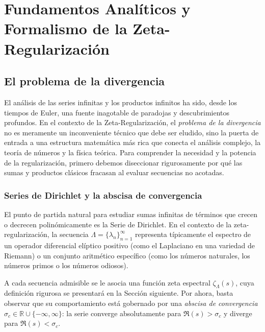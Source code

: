 \chapter{Fundamentos Analíticos y Formalismo de la Zeta-Regularización}

\section{El problema de la divergencia}

El análisis de las series infinitas y los productos infinitos ha sido, desde los tiempos de Euler, una fuente inagotable de paradojas y descubrimientos profundos. En el contexto de la Zeta-Regularización, el \textit{problema de la divergencia} no es meramente un inconveniente técnico que debe ser eludido, sino la puerta de entrada a una estructura matemática más rica que conecta el análisis complejo, la teoría de números y la física teórica. Para comprender la necesidad y la potencia de la regularización, primero debemos diseccionar rigurosamente por qué las sumas y productos clásicos fracasan al evaluar secuencias no acotadas.

\subsection{Series de Dirichlet y la abscisa de convergencia}

El punto de partida natural para estudiar sumas infinitas de términos que crecen o decrecen polinómicamente es la Serie de Dirichlet. En el contexto de la zeta-regularización, la secuencia $\Lambda = \{\lambda_n\}_{n=1}^{\infty}$ representa típicamente el espectro de un operador diferencial elíptico positivo (como el Laplaciano en una variedad de Riemann) o un conjunto aritmético específico (como los números naturales, los números primos o los números odiosos).

A cada secuencia admisible se le asocia una función zeta espectral $\zeta_\Lambda(s)$, cuya definición rigurosa se presentará en la Sección siguiente. Por ahora, basta observar que su comportamiento está gobernado por una \textit{abscisa de convergencia} $\sigma_c \in \mathbb{R} \cup \{-\infty, \infty\}$: la serie converge absolutamente para $\Re(s) > \sigma_c$ y diverge para $\Re(s) < \sigma_c$.

